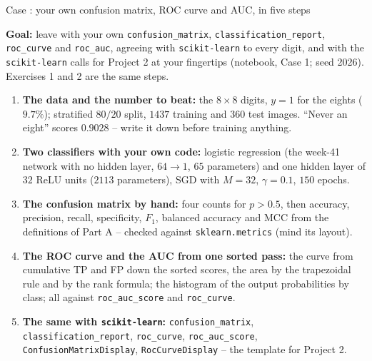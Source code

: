 \documentclass[10pt,aspectratio=169]{beamer}
\newcounter{case}
\newenvironment{case}[1][]{%
  \stepcounter{case}%
  \begin{frame}[fragile,environment=case]{Case \arabic{case}: #1}%
}{\end{frame}}
\begin{document}

\begin{case}[your own confusion matrix, ROC curve and AUC, in five steps]
\footnotesize
\textbf{Goal:} leave with your own \texttt{confusion\_matrix},
\texttt{classification\_report}, \texttt{roc\_curve} and \texttt{roc\_auc},
agreeing with \texttt{scikit-learn} to every digit, and with the
\texttt{scikit-learn} calls for Project 2 at your fingertips (notebook,
Case 1; seed 2026).  Exercises 1 and 2 are the same steps.
\begin{enumerate}
  \item \textbf{The data and the number to beat:} the $8\times8$ digits,
        $y=1$ for the eights ($9.7\%$); stratified $80/20$ split, $1437$
        training and $360$ test images.  ``Never an eight'' scores
        $0.9028$ -- write it down before training anything.
  \item \textbf{Two classifiers with your own code:} logistic regression
        (the week-41 network with no hidden layer, $64\to1$, $65$
        parameters) and one hidden layer of $32$ ReLU units ($2113$
        parameters), SGD with $M=32$, $\gamma=0.1$, $150$ epochs.
  \item \textbf{The confusion matrix by hand:} four counts for $p>0.5$,
        then accuracy, precision, recall, specificity, $F_1$, balanced
        accuracy and MCC from the definitions of Part A -- checked against
        \texttt{sklearn.metrics} (mind its layout).
  \item \textbf{The ROC curve and the AUC from one sorted pass:} the curve
        from cumulative TP and FP down the sorted scores, the area by the
        trapezoidal rule and by the rank formula; the histogram of the
        output probabilities by class; all against \texttt{roc\_auc\_score}
        and \texttt{roc\_curve}.
  \item \textbf{The same with \texttt{scikit-learn}:}
        \texttt{confusion\_matrix}, \texttt{classification\_report},
        \texttt{roc\_curve}, \texttt{roc\_auc\_score},
        \texttt{ConfusionMatrixDisplay}, \texttt{RocCurveDisplay} -- the
        template for Project 2.
\end{enumerate}
\end{case}
\end{document}
